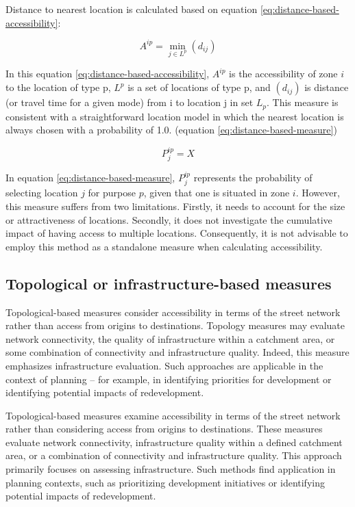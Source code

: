 \documentclass[
11pt, %
oneside, %
english, %
singlespacing, %
]{macthesis} %
\begin{document}
Distance to nearest location is calculated based on equation \ref{eq:distance-based-accessibility}:

\begin{equation}
A^{ip} = \min_{j \in L^p} (d_{ij})
\label{eq:distance-based-accessibility}
\end{equation}

In this equation \ref{eq:distance-based-accessibility}, \(A^{ip}\) is the accessibility of zone \(i\) to the location of type p, \(L^p\) is a set of locations of type p, and \((d_{ij})\) is distance (or travel time for a given mode) from i to location j in set \(L_p\). This measure is consistent with a straightforward location model in which the nearest location is always chosen with a probability of 1.0. (equation \ref{eq:distance-based-measure})

\begin{equation}
P^{ip}_j = X
\label{eq:distance-based-measure}
\end{equation}

In equation \ref{eq:distance-based-measure}, \(P_j^{ip}\) represents the probability of selecting location \(j\) for purpose \(p\), given that one is situated in zone \(i\). However, this measure suffers from two limitations. Firstly, it needs to account for the size or attractiveness of locations. Secondly, it does not investigate the cumulative impact of having access to multiple locations. Consequently, it is not advisable to employ this method as a standalone measure when calculating accessibility.

\subsection{Topological or infrastructure-based measures}\label{topological-or-infrastructure-based-measures}

Topological-based measures consider accessibility in terms of the street network rather than access from origins to destinations. Topology measures may evaluate network connectivity, the quality of infrastructure within a catchment area, or some combination of connectivity and infrastructure quality. Indeed, this measure emphasizes infrastructure evaluation. Such approaches are applicable in the context of planning -- for example, in identifying priorities for development or identifying potential impacts of redevelopment.

Topological-based measures examine accessibility in terms of the street network rather than considering access from origins to destinations. These measures evaluate network connectivity, infrastructure quality within a defined catchment area, or a combination of connectivity and infrastructure quality. This approach primarily focuses on assessing infrastructure. Such methods find application in planning contexts, such as prioritizing development initiatives or identifying potential impacts of redevelopment.
\end{document}
